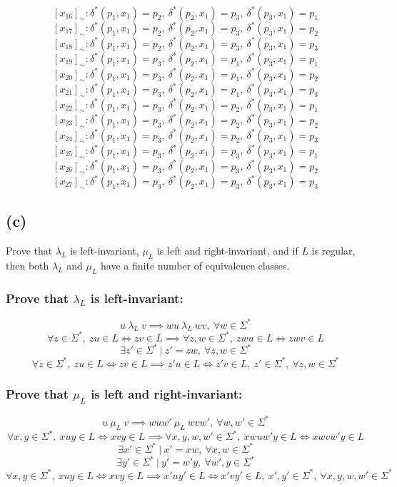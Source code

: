 \documentclass[12pt]{article}
\begin{document}
$$[x_{16}]_{\sim} : \delta^*(p_1, x_1) = p_2,\ \delta^*(p_2, x_1) = p_3,\ \delta^*(p_3, x_1) = p_1$$
$$[x_{17}]_{\sim} : \delta^*(p_1, x_1) = p_2,\ \delta^*(p_2, x_1) = p_3,\ \delta^*(p_3, x_1) = p_2$$
$$[x_{18}]_{\sim} : \delta^*(p_1, x_1) = p_2,\ \delta^*(p_2, x_1) = p_3,\ \delta^*(p_3, x_1) = p_3$$
$$[x_{19}]_{\sim} : \delta^*(p_1, x_1) = p_3,\ \delta^*(p_2, x_1) = p_1,\ \delta^*(p_3, x_1) = p_1$$
$$[x_{20}]_{\sim} : \delta^*(p_1, x_1) = p_3,\ \delta^*(p_2, x_1) = p_1,\ \delta^*(p_3, x_1) = p_2$$
$$[x_{21}]_{\sim} : \delta^*(p_1, x_1) = p_3,\ \delta^*(p_2, x_1) = p_1,\ \delta^*(p_3, x_1) = p_3$$
$$[x_{22}]_{\sim} : \delta^*(p_1, x_1) = p_3,\ \delta^*(p_2, x_1) = p_2,\ \delta^*(p_3, x_1) = p_1$$
$$[x_{23}]_{\sim} : \delta^*(p_1, x_1) = p_3,\ \delta^*(p_2, x_1) = p_2,\ \delta^*(p_3, x_1) = p_2$$
$$[x_{24}]_{\sim} : \delta^*(p_1, x_1) = p_3,\ \delta^*(p_2, x_1) = p_2,\ \delta^*(p_3, x_1) = p_3$$
$$[x_{25}]_{\sim} : \delta^*(p_1, x_1) = p_3,\ \delta^*(p_2, x_1) = p_3,\ \delta^*(p_3, x_1) = p_1$$
$$[x_{26}]_{\sim} : \delta^*(p_1, x_1) = p_3,\ \delta^*(p_2, x_1) = p_3,\ \delta^*(p_3, x_1) = p_2$$
$$[x_{27}]_{\sim} : \delta^*(p_1, x_1) = p_3,\ \delta^*(p_2, x_1) = p_3,\ \delta^*(p_3, x_1) = p_3$$

\newpage
\subsection*{(c)} Prove that $\lambda_L$ is left-invariant, $\mu_L$ is
left and right-invariant, and if $L$ is regular, then both $\lambda_L$ and
$\mu_L$ have a finite number of equivalence classes.

\subsubsection*{Prove that $\lambda_L$ is left-invariant:}
$$u\ \lambda_L\ v \implies wu\ \lambda_L\ wv,\ \forall w \in \Sigma^*$$
$$\forall z \in \Sigma^*,\ zu \in L \iff zv \in L \implies
\forall z,w \in \Sigma^*,\ zwu \in L \iff zwv \in L$$
$$\exists z' \in \Sigma^*\ |\ z'=zw,\ \forall z,w \in \Sigma^*$$
$$\forall z \in \Sigma^*,\ zu \in L \iff zv \in L \implies
z'u \in L \iff z'v \in L,\ z' \in \Sigma^*,\ \forall z,w \in \Sigma^*$$

\subsubsection*{Prove that $\mu_L$ is left and right-invariant:}
$$u\ \mu_L\ v \implies wuw'\ \mu_L\ wvw',\ \forall w,w' \in \Sigma^*$$
$$\forall x,y \in \Sigma^*,\ xuy \in L \iff xvy \in L \implies
\forall x,y,w,w' \in \Sigma^*,\ xwuw'y \in L \iff xwvw'y \in L$$
$$\exists x' \in \Sigma^*\ |\ x'=xw,\ \forall x,w \in \Sigma^*$$
$$\exists y' \in \Sigma^*\ |\ y'=w'y,\ \forall w',y \in \Sigma^*$$
$$\forall x,y \in \Sigma^*,\ xuy \in L \iff xvy \in L \implies
x'uy' \in L \iff x'vy' \in L,\ x',y' \in \Sigma^*,\ \forall x,y,w,w'
\in \Sigma^*$$
\end{document}
